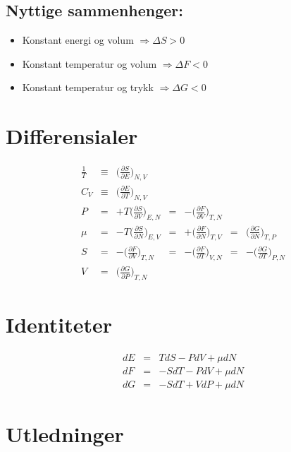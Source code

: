 \documentclass{article}
\begin{document}
\begin{multicols}{2}
\subsection*{Nyttige sammenhenger:}
\begin{itemize}
\item Konstant energi og volum \newline
$\Rightarrow\Delta S>0$
\item Konstant temperatur og volum \newline
$\Rightarrow\Delta F<0$
\item Konstant temperatur og trykk \newline
$\Rightarrow\Delta G<0$
\end{itemize}

\section*{Differensialer}
$$\begin{aligned}
\frac{1}{T}&\equiv&\bigg(\frac{\partial S}{\partial E}\bigg)_{N,V}\\
C_V&\equiv&\bigg(\frac{\partial E}{\partial T}\bigg)_{N,V}\\
P&=&+T\bigg(\frac{\partial S}{\partial V}\bigg)_{E,N}&=&-\bigg(\frac{\partial F}{\partial V}\bigg)_{T,N}\\
\mu&=&-T\bigg(\frac{\partial S}{\partial N}\bigg)_{E,V}&=&+\bigg(\frac{\partial F}{\partial N}\bigg)_{T,V}&=&\bigg(\frac{\partial G}{\partial N}\bigg)_{T,P}\\
S&=&-\bigg(\frac{\partial F}{\partial V}\bigg)_{T,N}&=&-\bigg(\frac{\partial F}{\partial T}\bigg)_{V,N}&=&-\bigg(\frac{\partial G}{\partial T}\bigg)_{P,N}\\
V&=&\bigg(\frac{\partial G}{\partial P}\bigg)_{T,N}
\end{aligned}$$

\section*{Identiteter}
$$\begin{aligned}
dE&=&TdS-PdV+\mu dN\\
dF&=&-SdT-PdV+\mu dN\\
dG&=&-SdT+VdP+\mu dN
\end{aligned}$$

\section*{Utledninger}

\end{multicols}
\end{document}
